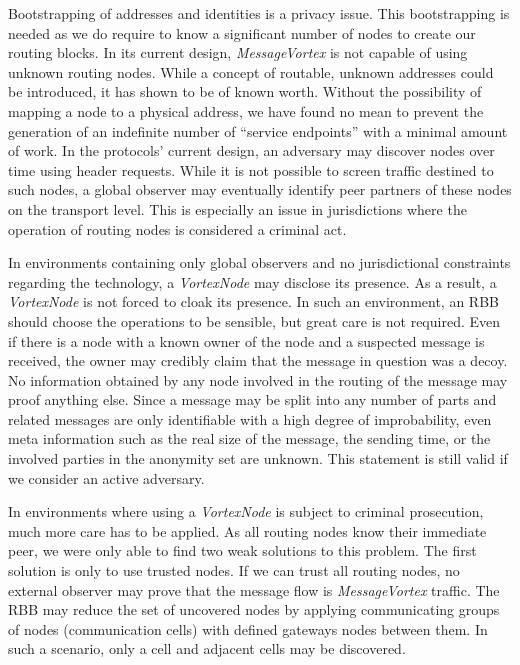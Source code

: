 \documentclass[acmsmall, screen, review]{acmart}
\begin{document}
Bootstrapping of addresses and identities is a privacy issue. This bootstrapping is needed as we do require to know a significant number of nodes to create our routing blocks. In its current design, \emph{MessageVortex} is not capable of using unknown routing nodes. While a concept of routable, unknown addresses could be introduced, it has shown to be of known worth. Without the possibility of mapping a node to a physical address, we have found no mean to prevent the generation of an indefinite number of ``service endpoints'' with a minimal amount of work. In the protocols' current design, an adversary may discover nodes over time using header requests. While it is not possible to screen traffic destined to such nodes, a global observer may eventually identify peer partners of these nodes on the transport level. This is especially an issue in jurisdictions where the operation of routing nodes is considered a criminal act. 

In environments containing only global observers and no jurisdictional constraints regarding the technology, a \emph{VortexNode} may disclose its presence. As a result, a \emph{VortexNode} is not forced to cloak its presence. In such an environment, an RBB should choose the operations to be sensible, but great care is not required. Even if there is a node with a known owner of the node and a suspected message is received, the owner may credibly claim that the message in question was a decoy. No information obtained by any node involved in the routing of the message may proof anything else. Since a message may be split into any number of parts and related messages are only identifiable with a high degree of improbability, even meta information such as the real size of the message, the sending time, or the involved parties in the anonymity set are unknown. This statement is still valid if we consider an active adversary.

In environments where using a \emph{VortexNode} is subject to criminal prosecution, much more care has to be applied. As all routing nodes know their immediate peer, we were only able to find two weak solutions to this problem. The first solution is only to use trusted nodes. If we can trust all routing nodes, no external observer may prove that the message flow is \emph{MessageVortex} traffic. The RBB may reduce the set of uncovered nodes by applying communicating groups of nodes (communication cells) with defined gateways nodes between them. In such a scenario, only a cell and adjacent cells may be discovered.
\end{document}
